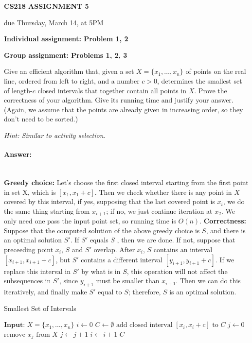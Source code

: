 \documentclass[11pt]{article}
\begin{document}
\centerline{\large \bf CS218 ASSIGNMENT 5}
\centerline{due Thursday, March 14, at 5PM}

\vskip 0.2in
\noindent
{\bf Individual assignment: Problem 1, 2}

\noindent
{\bf Group assignment: Problems 1, 2, 3}

\vskip 0.1in


\begin{problem}
Give an efficient algorithm that, given a set $X =\{x_1,\dots,x_n\}$ of points on the real line, ordered from left to right, and a number $c > 0$,
determines the smallest set of length-$c$ closed intervals that together contain all points in $X$. Prove the correctness of your algorithm. 
Give its running time and justify your answer. (Again, we assume that the points are already given in increasing order, so they don't need to be sorted.) 

\noindent\emph{Hint: Similar to activity selection.}
\end{problem}

\paragraph{Answer:}\mbox{} \\
\textbf{Greedy choice: }Let's choose the first closed interval starting from the first point in set X, which is $[x_1, x_1+c]$. Then we check whether there is any point in $X$ covered by this interval, if yes, supposing that the last covered point is $x_i$, we do the same thing starting from $x_{i+1}$; if no, we just continue iteration at $x_2$. \newline
We only need one pass the input point set, so running time is $O(n)$.\newline
\textbf{Correctness: }Suppose that the computed solution of the above greedy choice is $S$, and there is an optimal solution $S'$. If $S'$ equals $S$ , then we are done. If not, suppose that preceeding point $x_i$, $S$ and $S'$ overlap. After $x_i$, $S$ contains an interval $[x_{i+1}, x_{i+1}+c]$, but $S'$ contains a different interval $[y_{i+1}, y_{i+1}+c]$. If we replace this interval in $S'$ by what is in $S$, this operation will not affect the subsequences in $S'$, since $y_{i+1}$ must be smaller than $x_{i+1}$. Then we can do this iteratively, and finally make $S'$ equal to $S$; therefore, $S$ is an optimal solution.

\begin{algorithm}
    \begin{algorithmic}[1]
    \caption{Smallest Set of Intervals}
        \State $\textbf{Input: } X =\{x_1,\dots,x_n\}$
        \State $i \gets 0$
        \State $C \gets \emptyset$
            \State $\text{add closed interval } [x_i, x_i+c] \text{ to } C$
            \State $j \gets 0$
                \State $\text{remove } x_j \text{ from } X$    
                \State $j \gets j+1$
            \EndWhile
            \State $i \gets i+1$
        \EndWhile
        \Return $C$
    \end{algorithmic}
\end{algorithm}
\end{document}
